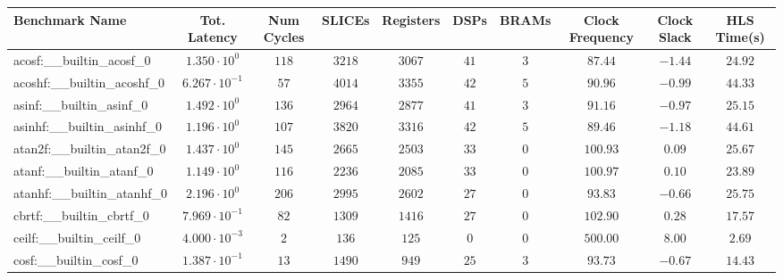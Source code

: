 \begin{tabular}{|l|c|c|c|c|c|c|c|c|c|}
\hline
Benchmark Name                            & Tot. Latency            & Num Cycles & SLICEs    & Registers & DSPs    & BRAMs  & Clock Frequency & Clock Slack & HLS Time(s) \\
\hline
acosf:\_\_builtin\_acosf\_0               & $ 1.350 \cdot 10^{0}  $ & $ 118    $ & $ 3218  $ & $ 3067  $ & $ 41  $ & $ 3  $ & $ 87.44       $ & $ -1.44   $ & $ 24.92   $ \\
acoshf:\_\_builtin\_acoshf\_0             & $ 6.267 \cdot 10^{-1} $ & $ 57     $ & $ 4014  $ & $ 3355  $ & $ 42  $ & $ 5  $ & $ 90.96       $ & $ -0.99   $ & $ 44.33   $ \\
asinf:\_\_builtin\_asinf\_0               & $ 1.492 \cdot 10^{0}  $ & $ 136    $ & $ 2964  $ & $ 2877  $ & $ 41  $ & $ 3  $ & $ 91.16       $ & $ -0.97   $ & $ 25.15   $ \\
asinhf:\_\_builtin\_asinhf\_0             & $ 1.196 \cdot 10^{0}  $ & $ 107    $ & $ 3820  $ & $ 3316  $ & $ 42  $ & $ 5  $ & $ 89.46       $ & $ -1.18   $ & $ 44.61   $ \\
atan2f:\_\_builtin\_atan2f\_0             & $ 1.437 \cdot 10^{0}  $ & $ 145    $ & $ 2665  $ & $ 2503  $ & $ 33  $ & $ 0  $ & $ 100.93      $ & $ 0.09    $ & $ 25.67   $ \\
atanf:\_\_builtin\_atanf\_0               & $ 1.149 \cdot 10^{0}  $ & $ 116    $ & $ 2236  $ & $ 2085  $ & $ 33  $ & $ 0  $ & $ 100.97      $ & $ 0.10    $ & $ 23.89   $ \\
atanhf:\_\_builtin\_atanhf\_0             & $ 2.196 \cdot 10^{0}  $ & $ 206    $ & $ 2995  $ & $ 2602  $ & $ 27  $ & $ 0  $ & $ 93.83       $ & $ -0.66   $ & $ 25.75   $ \\
cbrtf:\_\_builtin\_cbrtf\_0               & $ 7.969 \cdot 10^{-1} $ & $ 82     $ & $ 1309  $ & $ 1416  $ & $ 27  $ & $ 0  $ & $ 102.90      $ & $ 0.28    $ & $ 17.57   $ \\
ceilf:\_\_builtin\_ceilf\_0               & $ 4.000 \cdot 10^{-3} $ & $ 2      $ & $ 136   $ & $ 125   $ & $ 0   $ & $ 0  $ & $ 500.00      $ & $ 8.00    $ & $ 2.69    $ \\
cosf:\_\_builtin\_cosf\_0                 & $ 1.387 \cdot 10^{-1} $ & $ 13     $ & $ 1490  $ & $ 949   $ & $ 25  $ & $ 3  $ & $ 93.73       $ & $ -0.67   $ & $ 14.43   $ \\

\end{tabular}
